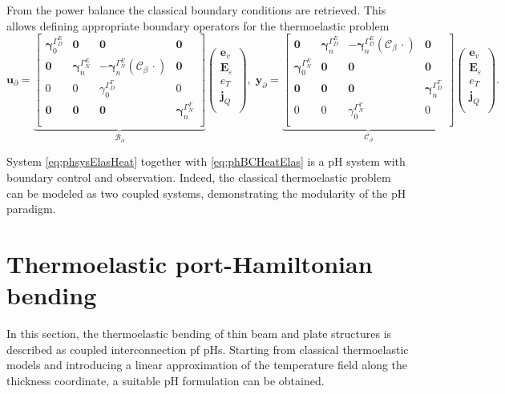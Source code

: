 From the power balance the classical boundary conditions are retrieved. This allows defining appropriate boundary operators for the thermoelastic problem
\begin{equation}\label{eq:phBCHeatElas}
	\bm{u}_\partial = 
	\underbrace{\begin{bmatrix}
	\bm{\gamma}_{0}^{\Gamma_D^E} & \bm{0} & \bm{0} & \bm{0} \\
	\bm{0} & \bm{\gamma}_n^{\Gamma_N^E} & - \bm{\gamma}_n^{\Gamma_N^E}(\mathcal{C}_\beta\, \cdot )  & \bm{0}  \\ 
	{0} & {0} & {\gamma}_{0}^{\Gamma_D^T} & {0} \\
	\bm{0} & \bm{0} & \bm{0} & \bm{\gamma}_{n}^{\Gamma_N^T} \\
	\end{bmatrix}}_{\mathcal{B}_\partial}
	\begin{pmatrix}
	\bm{e}_v \\
	\bm{E}_\varepsilon \\
	{e}_T \\
	\bm{j}_Q \\
	\end{pmatrix}, \; 
	\bm{y}_\partial = 
	\underbrace{\begin{bmatrix}
		\bm{0} & \bm{\gamma}_n^{\Gamma_D^E} & - \bm{\gamma}_n^{\Gamma_D^E}(\mathcal{C}_\beta\, \cdot )  & \bm{0}  \\ 
		\bm{\gamma}_{0}^{\Gamma_N^E} & \bm{0} & \bm{0} & \bm{0} \\
		\bm{0} & \bm{0} & \bm{0} & \bm{\gamma}_{n}^{\Gamma_D^T} \\
		{0} & {0} & {\gamma}_{0}^{\Gamma_N^T} & {0} \\
		\end{bmatrix}}_{\mathcal{C}_\partial}
	\begin{pmatrix}
	\bm{e}_v \\
	\bm{E}_\varepsilon \\
	{e}_T \\
	\bm{j}_Q \\
	\end{pmatrix}.
\end{equation} 

System \eqref{eq:phsysElasHeat} together with \eqref{eq:phBCHeatElas} is a pH system with boundary control and observation. Indeed, the classical thermoelastic problem can be modeled as two coupled systems, demonstrating the modularity of the pH paradigm.


\section{Thermoelastic port-Hamiltonian bending}
In this section, the thermoelastic bending of thin beam and plate structures is described as coupled interconnection pf pHs. Starting from classical thermoelastic models and introducing a linear approximation of the temperature field along the thickness coordinate, a suitable pH formulation can be obtained.  


